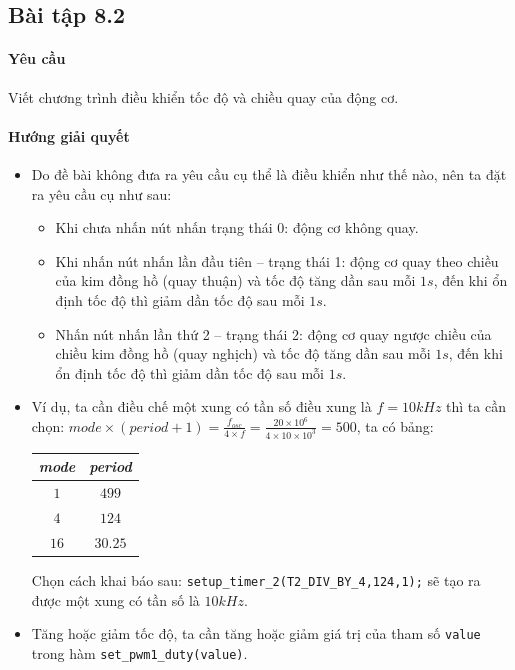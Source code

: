 \subsection{Bài tập 8.2}
\paragraph{Yêu cầu}Viết chương trình điều khiển tốc độ và chiều quay của động cơ.
\paragraph{Hướng giải quyết}
\begin{itemize}
\item Do đề bài không đưa ra yêu cầu cụ thể là điều khiển như thế nào, nên ta đặt ra yêu cầu cụ như sau:
\begin{itemize}
\item Khi chưa nhấn nút nhấn trạng thái 0: động cơ không quay.
\item Khi nhấn nút nhấn lần đầu tiên -- trạng thái 1: động cơ quay theo chiều của kim đồng hồ (quay thuận) và tốc độ tăng dần sau mỗi $1s$, đến khi ổn định tốc độ thì giảm dần tốc độ sau mỗi $1s$.
\item Nhấn nút nhấn lần thứ 2 -- trạng thái 2: động cơ quay ngược chiều của chiều kim đồng hồ (quay nghịch) và tốc độ tăng dần sau mỗi $1s$, đến khi ổn định tốc độ thì giảm dần tốc độ sau mỗi $1s$.
\end{itemize}
\item Ví dụ, ta cần điều chế một xung có tần số điều xung là $f = 10kHz$ thì ta cần chọn: $\displaystyle mode \times \left({period + 1}\right) = \frac{f_{osc}}{4 \times f} = \frac{20 \times 10^6}{4 \times 10 \times 10^3} = 500$, ta có bảng:
\begin{center}
\begin{tabular}{c|c}
\textit{mode} & \textit{period}\\ \hline
$1$ & $499$\\
$4$ & $124$\\
$16$ & $30.25$\\
\end{tabular}
\end{center}
Chọn cách khai báo sau: \verb|setup_timer_2(T2_DIV_BY_4,124,1);| sẽ tạo ra được một xung có tần số là $10kHz$.
\item Tăng hoặc giảm tốc độ, ta cần tăng hoặc giảm giá trị của tham số \verb|value| trong hàm \verb|set_pwm1_duty(value)|.


\end{itemize}

